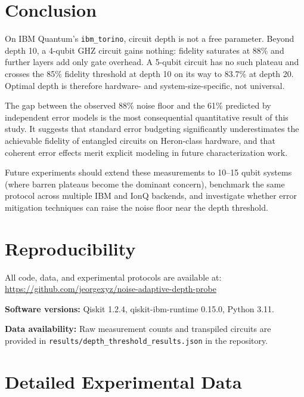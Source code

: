 \documentclass[12pt,letterpaper]{article}
\begin{document}
\section{Conclusion}

On IBM Quantum's \texttt{ibm\_torino}, circuit depth is not a free parameter.
Beyond depth 10, a 4-qubit GHZ circuit gains nothing: fidelity saturates at 88\%
and further layers add only gate overhead. A 5-qubit circuit has no such plateau
and crosses the 85\% fidelity threshold at depth 10 on its way to 83.7\% at depth
20. Optimal depth is therefore hardware- and system-size-specific, not universal.

The gap between the observed 88\% noise floor and the 61\% predicted by independent
error models is the most consequential quantitative result of this study. It suggests
that standard error budgeting significantly underestimates the achievable fidelity of
entangled circuits on Heron-class hardware, and that coherent error effects merit
explicit modeling in future characterization work.

Future experiments should extend these measurements to 10--15 qubit systems (where
barren plateaus become the dominant concern), benchmark the same protocol across
multiple IBM and IonQ backends, and investigate whether error mitigation techniques
can raise the noise floor near the depth threshold.

\section{Reproducibility}

All code, data, and experimental protocols are available at:\\
\url{https://github.com/jeorgexyz/noise-adaptive-depth-probe}

\noindent\textbf{Software versions:} Qiskit 1.2.4, qiskit-ibm-runtime 0.15.0,
Python 3.11.

\noindent\textbf{Data availability:} Raw measurement counts and transpiled circuits
are provided in \texttt{results/depth\_threshold\_results.json} in the repository.




\appendix

\section{Detailed Experimental Data}
\end{document}
